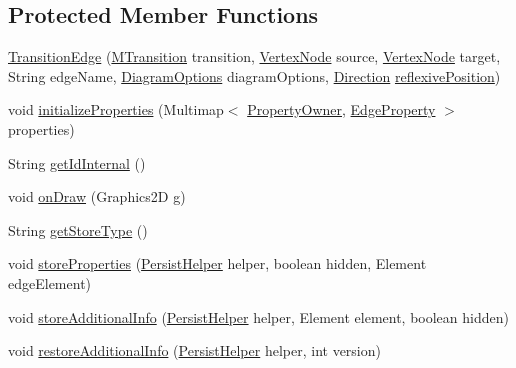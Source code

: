 \subsection*{Protected Member Functions}
\begin{DoxyCompactItemize}
\item 
\hyperlink{classorg_1_1tzi_1_1use_1_1gui_1_1views_1_1diagrams_1_1statemachine_1_1_transition_edge_a69f66260c80a3365da6445d1565a2ed9}{Transition\-Edge} (\hyperlink{classorg_1_1tzi_1_1use_1_1uml_1_1mm_1_1statemachines_1_1_m_transition}{M\-Transition} transition, \hyperlink{classorg_1_1tzi_1_1use_1_1gui_1_1views_1_1diagrams_1_1statemachine_1_1_vertex_node}{Vertex\-Node} source, \hyperlink{classorg_1_1tzi_1_1use_1_1gui_1_1views_1_1diagrams_1_1statemachine_1_1_vertex_node}{Vertex\-Node} target, String edge\-Name, \hyperlink{classorg_1_1tzi_1_1use_1_1gui_1_1views_1_1diagrams_1_1_diagram_options}{Diagram\-Options} diagram\-Options, \hyperlink{enumorg_1_1tzi_1_1use_1_1gui_1_1views_1_1diagrams_1_1util_1_1_direction}{Direction} \hyperlink{classorg_1_1tzi_1_1use_1_1gui_1_1views_1_1diagrams_1_1elements_1_1edges_1_1_edge_base_a3c4c59a344fe54ed87f8e637670930b5}{reflexive\-Position})
\item 
void \hyperlink{classorg_1_1tzi_1_1use_1_1gui_1_1views_1_1diagrams_1_1statemachine_1_1_transition_edge_a5f682d4a3f811c3a77f4a6f96ccca4f2}{initialize\-Properties} (Multimap$<$ \hyperlink{enumorg_1_1tzi_1_1use_1_1gui_1_1views_1_1diagrams_1_1elements_1_1edges_1_1_edge_base_1_1_property_owner}{Property\-Owner}, \hyperlink{classorg_1_1tzi_1_1use_1_1gui_1_1views_1_1diagrams_1_1elements_1_1_edge_property}{Edge\-Property} $>$ properties)
\item 
String \hyperlink{classorg_1_1tzi_1_1use_1_1gui_1_1views_1_1diagrams_1_1statemachine_1_1_transition_edge_a92a851244a0d5153fab5583ae3fc6d64}{get\-Id\-Internal} ()
\item 
void \hyperlink{classorg_1_1tzi_1_1use_1_1gui_1_1views_1_1diagrams_1_1statemachine_1_1_transition_edge_a430d9da178498247497a2478785757be}{on\-Draw} (Graphics2\-D g)
\item 
String \hyperlink{classorg_1_1tzi_1_1use_1_1gui_1_1views_1_1diagrams_1_1statemachine_1_1_transition_edge_ac31599d1c1411f1464a023e4a362beaa}{get\-Store\-Type} ()
\item 
void \hyperlink{classorg_1_1tzi_1_1use_1_1gui_1_1views_1_1diagrams_1_1statemachine_1_1_transition_edge_abf27aa4055cea2e068be91e75531acc3}{store\-Properties} (\hyperlink{classorg_1_1tzi_1_1use_1_1gui_1_1util_1_1_persist_helper}{Persist\-Helper} helper, boolean hidden, Element edge\-Element)
\item 
void \hyperlink{classorg_1_1tzi_1_1use_1_1gui_1_1views_1_1diagrams_1_1statemachine_1_1_transition_edge_a5a5dc425dc4b7ec8db2436cb93becb4a}{store\-Additional\-Info} (\hyperlink{classorg_1_1tzi_1_1use_1_1gui_1_1util_1_1_persist_helper}{Persist\-Helper} helper, Element element, boolean hidden)
\item 
void \hyperlink{classorg_1_1tzi_1_1use_1_1gui_1_1views_1_1diagrams_1_1statemachine_1_1_transition_edge_a80bdff8d413420fa85caa19c3ac5422b}{restore\-Additional\-Info} (\hyperlink{classorg_1_1tzi_1_1use_1_1gui_1_1util_1_1_persist_helper}{Persist\-Helper} helper, int version)
\end{DoxyCompactItemize}
